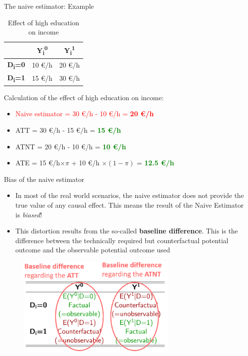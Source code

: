 \documentclass{beamer}\usepackage[]{graphicx}\usepackage[]{xcolor}
\begin{document}
\begin{frame}{The naive estimator: Example}
\begin{table}[]
\caption{Effect of high education on income}
\begin{tabular}{ccc}
\hline
\textbf{}                     & \textbf{Y\textsubscript{i}\textsuperscript{0}} & \textbf{Y\textsubscript{i}\textsuperscript{1}} \\ \hline
\textbf{D\textsubscript{i}=0} & {\color[HTML]{000000} 10 \euro/h}                  & {\color[HTML]{000000} 20 \euro/h}                   \\
\textbf{D\textsubscript{i}=1} & {\color[HTML]{000000} 15 \euro/h}                  & {\color[HTML]{000000} 30 \euro/h}                  \\ \hline
\end{tabular}
\end{table}
Calculation of the effect of high education on income:\\
\begin{itemize}
  \item \textcolor{red}{Naive estimator = 30 \euro/h - 10 \euro/h = \textbf{20 \euro/h}}
  \item ATT = 30 \euro/h - 15 \euro/h = \textcolor{green}{\textbf{15 \euro/h}}
  \item ATNT = 20 \euro/h - 10 \euro/h = \textcolor{green}{\textbf{10 \euro/h}}
  \item ATE = 15 \euro/h$\times \pi$ + 10 \euro/h $\times (1-\pi)$ = \textcolor{green}{\textbf{12.5 \euro/h}}
\end{itemize}
\end{frame}


\begin{frame}{Bias of the naive estimator}
\begin{itemize}
  \item In most of the real world scenarios, the naive estimator does not provide the true value of any causal effect. This means the result of the Naive Estimator is \textit{biased}! 
  \item This distortion results from the so-called \textbf{baseline difference}. This is the difference between the technically required but counterfactual potential outcome and the observable potential outcome used
\end{itemize}
\begin{figure}
\centering
\includegraphics[width=0.7\textwidth]{Graphics/BaselineDifferences.png}
\end{figure}
\end{frame}
\end{document}
